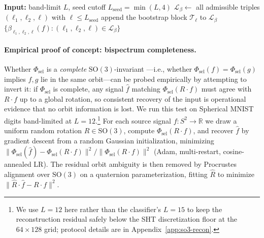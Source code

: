 \documentclass{article}
\theoremstyle{definition}
\theoremstyle{remark}
\newcommand{\R}{\mathbb{R}}
\newcommand{\SO}{\mathrm{SO}}
\theoremstyle{definition}
\begin{document}
\begin{algorithm}[H]
\caption{Bispectral triples in the Mataigne-style BFS chain
  (mirrors~\citet{mataigne2024selective}, Alg.~1): seed block at low
  degrees plus per-degree bootstrap blocks. The full index set of
  $\Phi_{\mathrm{sel}}$, including even self-couplings
  $\beta_{\ell,\ell,\ell'}$ and CG-power scalars
  $P_{\ell_1,\ell_2,\ell}$, is built by
  Algorithm~\ref{alg:so3-augmented} in
  Appendix~\ref{sec:app-selective-index}.}
\label{alg:selective-bsp-so3}
\small
\begin{algorithmic}[1]
\STATE \textbf{Input:} band-limit $L$,
  seed cutoff $L_{\mathrm{seed}} = \min(L,4)$
\STATE $\mathcal{L}_\beta \leftarrow$ all admissible triples
  $(\ell_1,\ell_2,\ell)$ with $\ell\le L_{\mathrm{seed}}$
  \STATE append the bootstrap block $\mathcal{T}_\ell$
    to $\mathcal{L}_\beta$
\ENDFOR
\RETURN $\{\beta_{\ell_1,\ell_2,\ell}(f) :
  (\ell_1,\ell_2,\ell)\in\mathcal{L}_\beta\}$
\end{algorithmic}
\end{algorithm}


\paragraph{Empirical proof of concept: bispectrum completeness.}
\label{sec:so3-recon}
Whether $\Phi_{\mathrm{sel}}$ is a \emph{complete} $\SO(3)$-invariant
---i.e., whether $\Phi_{\mathrm{sel}}(f) = \Phi_{\mathrm{sel}}(g)$
implies $f, g$ lie in the same orbit---can be probed empirically by
attempting to invert it: if $\Phi_{\mathrm{sel}}$ is complete, any
signal $\hat f$ matching $\Phi_{\mathrm{sel}}(R\cdot f)$ must agree
with $R\cdot f$ up to a global rotation, so consistent recovery of
the input is operational evidence that no orbit information is lost.
We run this test on Spherical MNIST digits band-limited at
$L = 12$.\footnote{We use $L{=}12$ here rather than the classifier's
$L{=}15$ to keep the reconstruction residual safely below the SHT
discretization floor at the $64{\times}128$ grid; protocol details
are in Appendix~\ref{app:so3-recon}.} For each source signal
$f:S^2\to\R$ we draw a uniform random rotation $R\in\SO(3)$, compute
$\Phi_{\mathrm{sel}}(R\cdot f)$, and recover $\hat f$ by gradient
descent from a random Gaussian initialization, minimizing
$\lVert \Phi_{\mathrm{sel}}(\hat f) -
\Phi_{\mathrm{sel}}(R\cdot f)\rVert^2 / \lVert
\Phi_{\mathrm{sel}}(R\cdot f)\rVert^2$ (Adam, multi-restart,
cosine-annealed LR). The residual orbit ambiguity is then removed by
Procrustes alignment over $\SO(3)$ on a quaternion parameterization,
fitting $\hat R$ to minimize $\lVert \hat R\cdot\hat f -
R\cdot f\rVert^2$.
\end{document}
